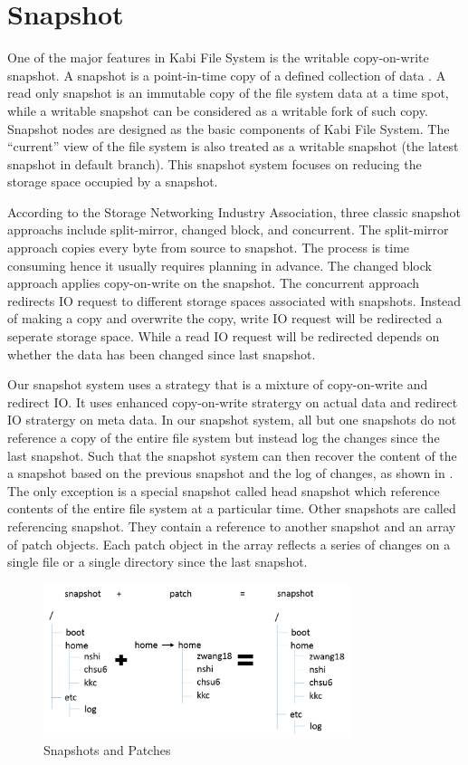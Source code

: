\chapter{Snapshot}
\label{chap:snapshot}

    One of the major features in Kabi File System is the writable copy-on-write snapshot. A snapshot is a point-in-time copy of a defined collection of data \cite{snapshot_def}. A read only snapshot is an immutable copy of the file system data at a time spot, while a writable snapshot can be considered as a writable fork of such copy. Snapshot nodes are designed as the basic components of Kabi File System. The ``current'' view of the file system is also treated as a writable snapshot (the latest snapshot in default branch). This snapshot system focuses on reducing the storage space occupied by a snapshot.

    According to the Storage Networking Industry Association, three classic snapshot approachs include split-mirror, changed block, and concurrent.\cite{snapshot_types} The split-mirror approach copies every byte from source to snapshot. The process is time consuming hence it usually requires planning in advance. The changed block approach applies copy-on-write on the snapshot. The concurrent approach redirects IO request to different storage spaces associated with snapshots. Instead of making a copy and overwrite the copy, write IO request will be redirected a seperate storage space. While a read IO request will be redirected depends on whether the data has been changed since last snapshot.

    Our snapshot system uses a strategy that is a mixture of copy-on-write and redirect IO. It uses enhanced copy-on-write stratergy on actual data and redirect IO stratergy on meta data. In our snapshot system, all but one snapshots do not reference a copy of the entire file system but instead log the changes since the last snapshot. Such that the snapshot system can then recover the content of the a snapshot based on the previous snapshot and the log of changes, as shown in . The only exception is a special snapshot called head snapshot which reference contents of the entire file system at a particular time. Other snapshots are called referencing snapshot. They contain a reference to another snapshot and an array of patch objects. Each patch object in the array reflects a series of changes on a single file or a single directory since the last snapshot.

\begin{figure}[t]
\centering
\includegraphics[width=0.8\textwidth]{Chapter-4/figs/fig23.png}
\caption{Snapshots and Patches}
\label{fig:snapshot_patch}
\end{figure}

